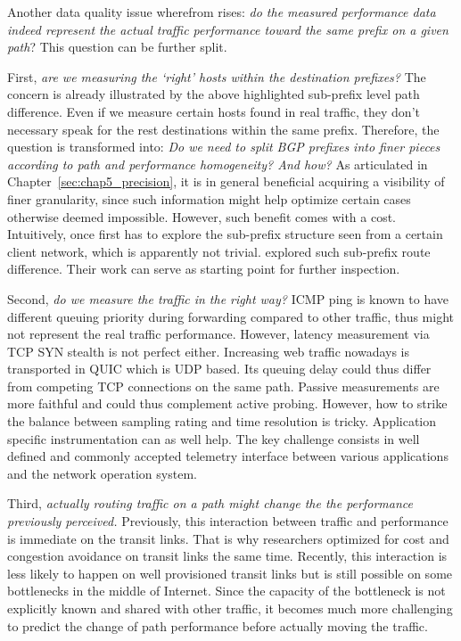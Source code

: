 Another data quality issue wherefrom rises: \textit{do the measured performance data indeed represent the actual traffic performance toward the same prefix on a given path}?
This question can be further split. 

First, \textit{are we measuring the `right' hosts within the destination prefixes?} The concern is already illustrated by the above highlighted sub-prefix level path difference. Even if we measure certain hosts found in real traffic, they don't necessary speak for the rest destinations within the same prefix.
Therefore, the question is transformed into: \textit{Do we need to split BGP prefixes into finer pieces according to path and performance homogeneity? And how?}
As articulated in Chapter~\ref{sec:chap5_precision}, it is in general beneficial acquiring a visibility of finer granularity, since such information might help optimize certain cases otherwise deemed impossible.
However, such benefit comes with a cost. Intuitively, once first has to explore the sub-prefix structure seen from a certain client network, which is apparently not trivial.
\citet{Lee2016} explored such sub-prefix route difference. Their work can serve as starting point for further inspection.

Second, \textit{do we measure the traffic in the right way?} ICMP ping is known to have different queuing priority during forwarding compared to other traffic, thus might not represent the real traffic performance. However, latency measurement via TCP SYN stealth is not perfect either. Increasing web traffic nowadays is transported in QUIC which is UDP based. Its queuing delay could thus differ from competing TCP connections on the same path.
Passive measurements are more faithful and could thus complement active probing. However, how to strike the balance between sampling rating and time resolution is tricky.
Application specific instrumentation can as well help. The key challenge consists in well defined and commonly accepted telemetry interface between various applications and the network operation system.


Third, \textit{actually routing traffic on a path might change the the performance previously perceived.} Previously, this interaction between traffic and performance is immediate on the transit links. That is why researchers optimized for cost and congestion avoidance on transit links the same time. Recently, this interaction is less likely to happen on well provisioned transit links but is still possible on some bottlenecks in the middle of Internet. Since the capacity of the bottleneck is not explicitly known and shared with other traffic, it becomes much more challenging to predict the change of path performance before actually moving the traffic.  
\fi


